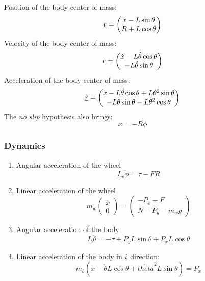 \documentclass{article}
\begin{document}
\noindent Position of the body center of mass:
\begin{equation}
  \underline{r} = \begin{pmatrix}x-L\sin{\theta} \\ R+L\cos{\theta}\end{pmatrix}
\end{equation}
Velocity of the body center of mass:
\begin{equation}
  \dot{\underline{r}} = \begin{pmatrix}\dot{x}-L\dot{\theta}\cos{\theta} \\ -L\dot{\theta}\sin{\theta}\end{pmatrix}
\end{equation}
Acceleration of the body center of mass:
\begin{equation}
  \ddot{\underline{r}} = \begin{pmatrix}
    \ddot{x}-L\ddot{\theta}\cos{\theta} + L \dot{\theta}^2\sin{\theta}\\
    -L\ddot{\theta}\sin{\theta} - L \dot{\theta}^2 \cos{\theta} \end{pmatrix}
\end{equation}
The \emph{no slip} hypothesis also brings:
\begin{equation}
  x = -R \phi
\end{equation}

\subsubsection{Dynamics}

\begin{enumerate}
\item Angular acceleration of the wheel
  \begin{equation}
    I_w \ddot{\phi} = \tau - F R
  \end{equation}
\item Linear acceleration of the wheel
  \begin{equation}
    m_w \begin{pmatrix} \ddot{x} \\ 0 \end{pmatrix} = \begin{pmatrix}-P_x - F \\ N - P_y -m_w g \end{pmatrix}
  \end{equation}
\item Angular acceleration of the body
   \begin{equation}
    I_b \ddot{\theta} = -\tau + P_y L \sin{\theta} + P_x L \cos{\theta}
   \end{equation}
 \item Linear acceleration of the body
   in $\underline{i}$ direction: \begin{equation} m_b (\ddot{x} -\dot{\theta}L\cos{\theta} + \dot{theta}^2 L \sin{\theta}) = P_x \end{equation}
\end{enumerate}
\end{document}
